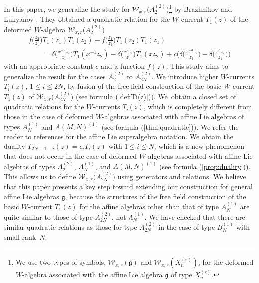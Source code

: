 \documentclass[10pt,a4paper]{amsart}
\numberwithin{equation}{section}
\begin{document}
In this {paper}, we generalize the study for
${\mathcal W}_{x,r}\bigl(A_2^{(2)}\bigr)$\footnote{We use two types of symbols,
${\mathcal W}_{x,r}({\mathfrak g})$ and
${\mathcal W}_{x,r}(X_n^{(r)})$,
for the deformed $W$-algebra associated with the affine Lie algebra
${\mathfrak g}$ of type $X_n^{(r)}$.}
by Brazhnikov and Lukyanov \cite{Brazhnikov-Lukyanov}.
They obtained
a quadratic relation for
the $W$-current $T_1(z)$ of
the deformed $W$-algebra ${\mathcal W}_{x,r}\bigl(A_2^{(2)}\bigr)$
\begin{gather*}
f\biggl(\frac{z_2}{z_1}\biggr)T_1(z_1)T_1(z_2)-
f\biggl(\frac{z_1}{z_2}\biggr)T_1(z_2)T_1(z_1)
\\ \qquad
{}=\delta\biggl(\frac{x^{-2}z_2}{z_1}\biggr)T_1(x^{-1}z_2)
-\delta\biggl(\frac{x^{2}z_2}{z_1}\biggr)T_1(xz_2)+c \biggl(
\delta\biggl(\frac{x^{-3}z_2}{z_1}\biggr)
-\delta\biggl(\frac{x^{3}z_2}{z_1}\biggr)\biggr)
\end{gather*}
with an appropriate constant $c$ and a function $f(z)$.
This study aims to generalize the result for the cases
$A_2^{(2)}$ to $A_{2N}^{(2)}$.
We introduce higher
$W$-currents $T_i(z)${, $1 \leq i \leq 2N$,}
by fusion of
the free field construction of the basic $W$-current $T_1(z)$
of ${\mathcal W}_{x,r}\bigl(A_{2N}^{(2)}\bigr)$ \cite{Frenkel-Reshetikhin1}
(see formula (\ref{def:Ti(z)})).
We~obtain a closed set of quadratic relations for the $W$-currents $T_i(z)$,
which is completely different from those
{in the case of deformed $W$-algebras associated with affine Lie algebras of types} $A_N^{(1)}$ and $A(M,N)^{(1)}$
(see formula (\ref{thm:quadratic})).
{We refer the reader to references \cite{Leur1, Leur2}
for the affine Lie superalgebra notation.}
We obtain the duality $T_{2N+1-i}(z)=c_i T_{i}(z)$
with $1 \leq i \leq N$, which
is a new {phenomenon} that does not occur in
the case of deformed $W$-algebras associated with
affine Lie algebras of types
$A_2^{(2)}$, $A_N^{(1)}$, and $A(M,N)^{(1)}$
(see formula (\ref{prop:duality})).
This allows us to define ${\mathcal W}_{x,r}\bigl(A_{2N}^{(2)}\bigr)$ using
generators and relations.
We believe
that this paper presents a key step toward extending our construction for general affine Lie algebras
${\mathfrak g}$, because the structures of
the free field construction of the basic $W$-current
$T_1(z)$ for the affine algebras other than {that of type}
$A_N^{(1)}$
are quite similar to those of {type} $A_{2N}^{(2)}$, not $A_N^{(1)}$.
We have checked that there are similar quadratic relations as
those {for type $A_{2N}^{(2)}$} in the case
of {type} $B_N^{(1)}$ with small rank~$N$.
\end{document}
